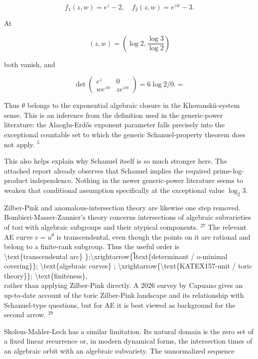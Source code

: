\documentclass[10pt]{article}
\begin{document}
$$
f_{1}(z, w)=e^{z}-2, \quad f_{2}(z, w)=e^{z w}-3 .
$$

At

$$
(z, w)=\left(\log 2, \frac{\log 3}{\log 2}\right)
$$

both vanish, and

$$
\operatorname{det}\left(\begin{array}{cc}
e^{z} & 0 \\
w e^{z w} & z e^{z w}
\end{array}\right)=6 \log 2 / 0 .=
$$

Thus $\theta$ belongs to the exponential algebraic closure in the Khovanskii-system sense. This is an inference from the definition used in the generic-power literature: the Alaoglu-Erdős exponent parameter falls precisely into the exceptional countable set to which the generic Schanuel-property theorem does not apply. ${ }^{5}$

This also helps explain why Schanuel itself is so much stronger here. The attached report already observes that Schanuel implies the required prime-log-product independence. Nothing in the newer generic-power literature seems to weaken that conditional assumption specifically at the exceptional value $\log _{2} 3$.

Zilber-Pink and anomalous-intersection theory are likewise one step removed. Bombieri-Masser-Zannier's theory concerns intersections of algebraic subvarieties of tori with algebraic subgroups and their atypical components. ${ }^{27}$ The relevant AE curve $v=u^{\theta}$ is transcendental, even though the points on it are rational and belong to a finite-rank subgroup. Thus the useful order is\\
\textbackslash text\{transcendental arc\} \};\textbackslash xrightarrow\{ไtext\{determinant / o-minimal covering\}\}; \textbackslash text\{algebraic curves\} ; \textbackslash xrightarrow\{\textbackslash text\{KATEX157-unit / toric theory\}\}; \textbackslash text\{finiteness\},\\
rather than applying Zilber-Pink directly. A 2026 survey by Capuano gives an up-to-date account of the toric Zilber-Pink landscape and its relationship with Schanuel-type questions, but for AE it is best viewed as background for the second arrow. ${ }^{29}$

Skolem-Mahler-Lech has a similar limitation. Its natural domain is the zero set of a fixed linear recurrence or, in modern dynamical forms, the intersection times of an algebraic orbit with an algebraic subvariety. The unnormalized sequence
\end{document}
